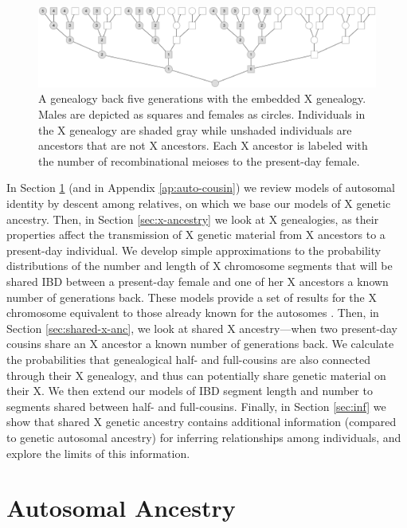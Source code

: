 \documentclass[11pt]{article}
\begin{document}
\begin{figure}[!ht]
  \centering
  \includegraphics[width=\textwidth]{images/x-rm-tree.eps}

  \caption{A genealogy back five generations with the embedded X genealogy.
    Males are depicted as squares and females as circles.  Individuals in the X
    genealogy are shaded gray while unshaded individuals are ancestors that are
    not X ancestors. Each X ancestor is labeled with the number of
  recombinational meioses to the present-day female.}
  \label{fig:x-rm-tree}
\end{figure}

In Section \ref{sec:auto-ancestry} (and in Appendix \ref{ap:auto-cousin}) we
review models of autosomal identity by descent among relatives, on which we
base our models of X genetic ancestry.  Then, in Section \ref{sec:x-ancestry}
we look at X genealogies, as their properties affect the transmission of X
genetic material from X ancestors to a present-day individual. We develop
simple approximations to the probability distributions of the number and length
of X chromosome segments that will be shared IBD between a present-day female
and one of her X ancestors a known number of generations back. These models
provide a set of results for the X chromosome equivalent to those already known
for the autosomes \citep{Donnelly:1983fi,thomas:1994hg}. Then, in Section
\ref{sec:shared-x-anc}, we look at shared X ancestry---when two present-day
cousins share an X ancestor a known number of generations back. We calculate
the probabilities that genealogical half- and full-cousins are also connected
through their X genealogy, and thus can potentially share genetic material on
their X. We then extend our models of IBD segment length and number to segments
shared between half- and full-cousins. Finally, in Section \ref{sec:inf} we
show that shared X genetic ancestry contains additional information (compared
to genetic autosomal ancestry) for inferring relationships among individuals,
and explore the limits of this information. 

\section{Autosomal Ancestry}
\label{sec:auto-ancestry}
\end{document}
